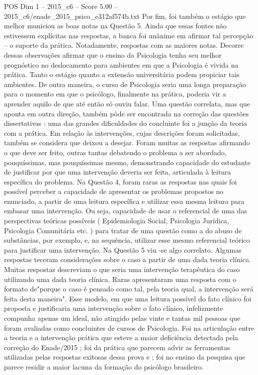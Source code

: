 \begin{textsample}{POS Dim 1 – 2015\_c6 – Score 5.00 – 2015\_c6/enade\_2015\_psico\_e312af574b.txt}
Por fim, foi também o estágio que melhor municiou as boas notas na Questão 5.
Ainda que essas fontes não estivessem explícitas nas respostas, a banca foi unânime em afirmar tal percepção – o suporte da prática.
Notadamente, respostas com as maiores notas.
Decorre dessas observações afirmar que o ensino da Psicologia tenha seu melhor prognóstico no deslocamento para ambientes em que a Psicologia é vivida na prática.
Tanto o estágio quanto a extensão universitária podem propiciar tais ambientes.
De outra maneira, o curso de Psicologia seria uma longa preparação para o momento em que o psicólogo, finalmente na prática, poderia vir a aprender aquilo de que até então só ouviu falar.
Uma questão correlata, mas que aponta em outra direção, também pôde ser encontrada na correção das questões dissertativas : uma das grandes dificuldades do concluinte foi a junção da teoria com a prática.
Em relação às intervenções, cujas descrições foram solicitadas, também se considera que deixou a desejar.
Foram muitas as respostas afirmando o que deve ser feito, outras tantas debatendo o problema a ser abordado, pouquíssimas, mas pouquíssimas mesmo, demonstrando capacidade do estudante de justificar por que uma intervenção deveria ser feita, articulada à leitura específica do problema.
Na Questão 4, foram raras as respostas nas quais foi possível perceber a capacidade de apresentar os problemas propostos no enunciado, a partir de uma leitura específica e utilizar essa mesma leitura para embasar uma intervenção.
Ou seja, capacidade de usar o referencial de uma das perspectivas teóricas possíveis ( Epidemiologia Social, Psicologia Jurídica, Psicologia Comunitária etc. ) para tratar de uma questão como a do abuso de substâncias, por exemplo, e, na sequência, utilizar esse mesmo referencial teórico para justificar uma intervenção.
Na Questão 5 viu -se algo correlato.
Algumas respostas teceram considerações sobre o caso a partir de uma dada teoria clínica.
Muitas respostas descreviam o que seria uma intervenção terapêutica do caso utilizando uma dada teoria clínica.
Raras apresentaram uma resposta com o formato de"porque o caso é pensado como tal, pela teoria qual, a intervenção será feita desta maneira".
Esse modelo, em que uma leitura possível do fato clínico foi proposta e justificaria uma intervenção sobre o fato clínico, infelizmente compunha apenas um ideal, não atingido pelas vinte e tantas mil pessoas que foram avaliadas como concluintes de cursos de Psicologia.
Foi na articulação entre a teoria e a intervenção prática que esteve a maior deficiência detectada pela correção do Enade/2015 ; foi da prática que parecem advir as ferramentas utilizadas pelas respostas exitosas dessa prova e ; foi no ensino da pesquisa que parece residir a maior lacuna da formação do psicólogo brasileiro.

\end{textsample}
